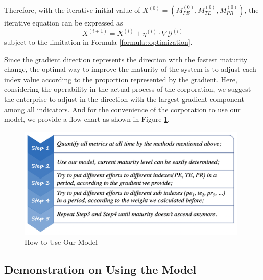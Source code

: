 \documentclass{mcmthesis}
\begin{document}
Therefore, with the iterative initial value of $X^{(0)}=(M_{PE}^{(0)},M_{TE}^{(0)},M_{PR}^{(0)})$, the iterative equation\cite{7} can be expressed as
\begin{equation}
    X^{(i+1)} = X^{(i)}+\eta^{(i)} \cdot \nabla \mathscr{G}^{(i)}
\end{equation}
subject to the limitation in Formula \ref{formula::optimization}.

Since the gradient direction represents the direction with the fastest maturity change, the optimal way to improve the maturity of the system is to adjust each index value according to the proportion represented by the gradient. Here, considering the operability in the actual process of the corporation, we suggest the enterprise to adjust in the direction with the largest gradient component among all indicators. And for the convenience of the corporation to use our model, we provide a flow chart as shown in Figure \ref{figure::flowchart}.

\begin{figure}[!htbp]
    \small
    \centering
    \includegraphics[width=11cm]{figures/FlowChart.png}
    \caption{How to Use Our Model} 
    \label{figure::flowchart}
\end{figure}%


\subsection{Demonstration on Using the Model}
\end{document}
